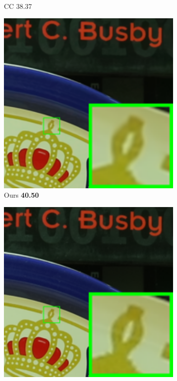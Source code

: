 \begin{figure}
\begin{subfigure}[t]{0.19\textwidth}
\caption{CC 38.37}
    \end{subfigure}
    \hfill
    \begin{subfigure}[t]{0.19\textwidth}
        \centering
        \includegraphics[width=1\textwidth]{images/guided/resize_br_Guided_5dmark3_iso3200_1.png}
\caption{Ours \textbf{40.50}}
    \end{subfigure}
    \hfill
    \begin{subfigure}[t]{0.19\textwidth}
        \centering
        \includegraphics[width=1\textwidth]{images/guided/resize_br_Mean_5dmark3_iso3200_1_real.png}

\end{subfigure}
\end{figure}
